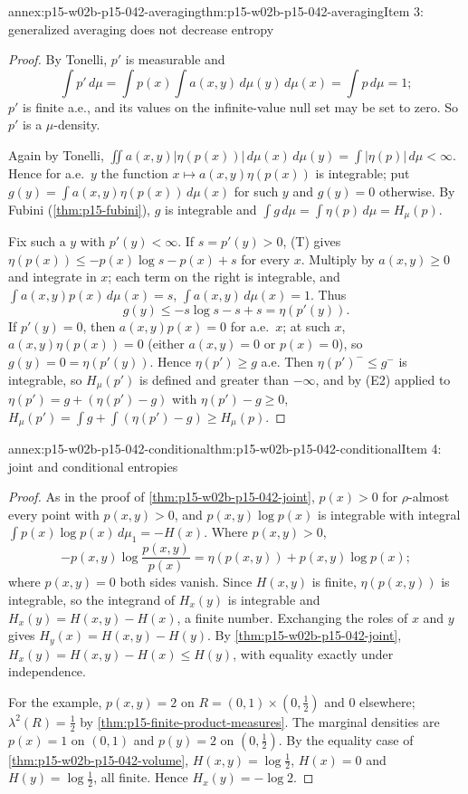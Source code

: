 \begin{annexitem}{annex:p15-w02b-p15-042-averaging}{thm:p15-w02b-p15-042-averaging}{Item 3: generalized averaging does not decrease entropy}
\begin{proof}
By Tonelli, \(p'\) is measurable and
\[
 \int p'\,d\mu=\int p(x)\int a(x,y)\,d\mu(y)\,d\mu(x)=\int p\,d\mu=1;
\]
\(p'\) is finite a.e., and its values on the infinite-value null set may be
set to zero. So \(p'\) is a \(\mu\)-density.

Again by Tonelli,
\(\iint a(x,y)|\eta(p(x))|\,d\mu(x)\,d\mu(y)=\int|\eta(p)|\,d\mu<\infty\).
Hence for a.e.\ \(y\) the function \(x\mapsto a(x,y)\eta(p(x))\) is
integrable; put \(g(y)=\int a(x,y)\eta(p(x))\,d\mu(x)\) for such \(y\) and
\(g(y)=0\) otherwise. By Fubini (\cref{thm:p15-fubini}), \(g\) is integrable
and \(\int g\,d\mu=\int\eta(p)\,d\mu=H_\mu(p)\).

Fix such a \(y\) with \(p'(y)<\infty\). If \(s=p'(y)>0\), (T) gives
\(\eta(p(x))\leq-p(x)\log s-p(x)+s\) for every \(x\). Multiply by
\(a(x,y)\geq0\) and integrate in \(x\); each term on the right is integrable,
and \(\int a(x,y)p(x)\,d\mu(x)=s\), \(\int a(x,y)\,d\mu(x)=1\). Thus
\[
 g(y)\leq-s\log s-s+s=\eta(p'(y)).
\]
If \(p'(y)=0\), then \(a(x,y)p(x)=0\) for a.e.\ \(x\); at such \(x\),
\(a(x,y)\eta(p(x))=0\) (either \(a(x,y)=0\) or \(p(x)=0\)), so
\(g(y)=0=\eta(p'(y))\). Hence \(\eta(p')\geq g\) a.e. Then
\(\eta(p')^-\leq g^-\) is integrable, so \(H_\mu(p')\) is defined and
greater than \(-\infty\), and by (E2) applied to
\(\eta(p')=g+(\eta(p')-g)\) with \(\eta(p')-g\geq0\),
\(H_\mu(p')=\int g+\int(\eta(p')-g)\geq H_\mu(p)\).
\end{proof}
\end{annexitem}

\begin{annexitem}{annex:p15-w02b-p15-042-conditional}{thm:p15-w02b-p15-042-conditional}{Item 4: joint and conditional entropies}
\begin{proof}
As in the proof of \cref{thm:p15-w02b-p15-042-joint}, \(p(x)>0\) for
\(\rho\)-almost every point with \(p(x,y)>0\), and \(p(x,y)\log p(x)\) is
integrable with integral \(\int p(x)\log p(x)\,d\mu_1=-H(x)\). Where
\(p(x,y)>0\),
\[
 -p(x,y)\log\frac{p(x,y)}{p(x)}=\eta(p(x,y))+p(x,y)\log p(x);
\]
where \(p(x,y)=0\) both sides vanish. Since \(H(x,y)\) is finite, \(\eta(p(x,y))\)
is integrable, so the integrand of \(H_x(y)\) is integrable and
\(H_x(y)=H(x,y)-H(x)\), a finite number. Exchanging the roles of \(x\) and
\(y\) gives \(H_y(x)=H(x,y)-H(y)\). By \cref{thm:p15-w02b-p15-042-joint},
\(H_x(y)=H(x,y)-H(x)\leq H(y)\), with equality exactly under independence.

For the example, \(p(x,y)=2\) on \(R=(0,1)\times(0,\tfrac12)\) and \(0\)
elsewhere; \(\lambda^2(R)=\tfrac12\) by \cref{thm:p15-finite-product-measures}.
The marginal densities are \(p(x)=1\) on \((0,1)\) and \(p(y)=2\) on
\((0,\tfrac12)\). By the equality case of \cref{thm:p15-w02b-p15-042-volume},
\(H(x,y)=\log\tfrac12\), \(H(x)=0\) and \(H(y)=\log\tfrac12\), all finite.
Hence \(H_x(y)=-\log2\).
\end{proof}
\end{annexitem}

